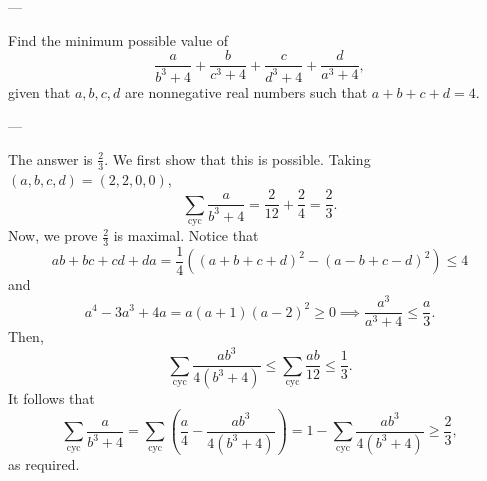 
---

Find the minimum possible value of \[\frac a{b^3+4}+\frac b{c^3+4}+\frac c{d^3+4}+\frac d{a^3+4},\]
given that $a,b,c,d$ are nonnegative real numbers such that $a+b+c+d=4$.

---

The answer is $\tfrac23$. We first show that this is possible. Taking $(a,b,c,d)=(2,2,0,0)$, \[\sum_{\mathrm{cyc}}\frac a{b^3+4}=\frac2{12}+\frac24=\frac23.\]
Now, we prove $\tfrac23$ is maximal. Notice that \[ab+bc+cd+da=\frac14((a+b+c+d)^2-(a-b+c-d)^2)\le 4\]
and \[a^4-3a^3+4a=a(a+1)(a-2)^2\ge 0\implies\frac{a^3}{a^3+4}\le\frac a3.\]
Then, \[\sum_{\mathrm{cyc}}\frac{ab^3}{4(b^3+4)}\le\sum_{\mathrm{cyc}}\frac{ab}{12}\le\frac13.\]
It follows that \[\sum_{\mathrm{cyc}}\frac a{b^3+4}=\sum_{\mathrm{cyc}}\left(\frac a4-\frac{ab^3}{4(b^3+4)}\right)=1-\sum_{\mathrm{cyc}}\frac{ab^3}{4(b^3+4)}\ge\frac23,\]
as required.
